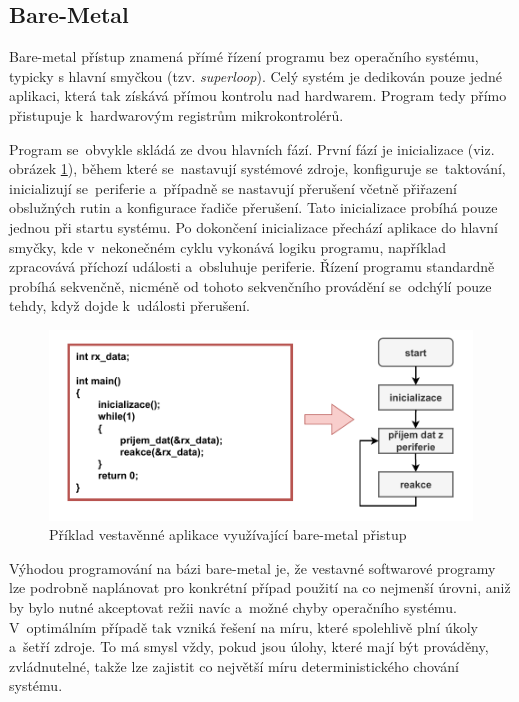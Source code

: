 \subsection{Bare-Metal}
Bare-metal přístup znamená přímé řízení programu bez operačního systému, typicky s hlavní smyčkou (tzv. \emph{superloop}). Celý systém je dedikován pouze jedné aplikaci, která tak získává přímou kontrolu nad hardwarem. Program tedy přímo přistupuje k~hardwarovým registrům mikrokontrolérů.~\cite{sysgo_baremetal_vs_rtos}

Program se~obvykle skládá ze dvou hlavních fází. První fází je inicializace (viz. obrázek \ref{fig:bare-metal}), během které se~nastavují systémové zdroje, konfiguruje se~taktování, inicializují se~periferie a~případně se nastavují přerušení včetně přiřazení obslužných rutin a konfigurace řadiče přerušení. Tato inicializace probíhá pouze jednou při startu systému. Po dokončení inicializace přechází aplikace do hlavní smyčky, kde v~nekonečném cyklu vykonává logiku programu, například zpracovává příchozí události a~obsluhuje periferie. Řízení programu standardně probíhá sekvenčně, nicméně od tohoto sekvenčního provádění se~odchýlí pouze tehdy, když dojde k~události přerušení.~\cite{sysgo_baremetal_vs_rtos}

\begin{figure}[h]
    \centering
    \includegraphics[width=1.00\textwidth]{obrazky-figures/bare_metal-1.pdf}
    
    \caption{Příklad vestavěnné aplikace využívající bare-metal přistup}
    \label{fig:bare-metal}
\end{figure}


Výhodou programování na bázi bare-metal je, že vestavné softwarové programy lze podrobně naplánovat pro konkrétní případ použití na co nejmenší úrovni, aniž by bylo nutné akceptovat režii navíc a~možné chyby operačního systému. V~optimálním případě tak vzniká řešení na míru, které spolehlivě plní úkoly a~šetří zdroje. To má smysl vždy, pokud jsou úlohy, které mají být prováděny, zvládnutelné, takže lze zajistit co největší míru deterministického chování systému.~\cite{sysgo_baremetal_vs_rtos}

